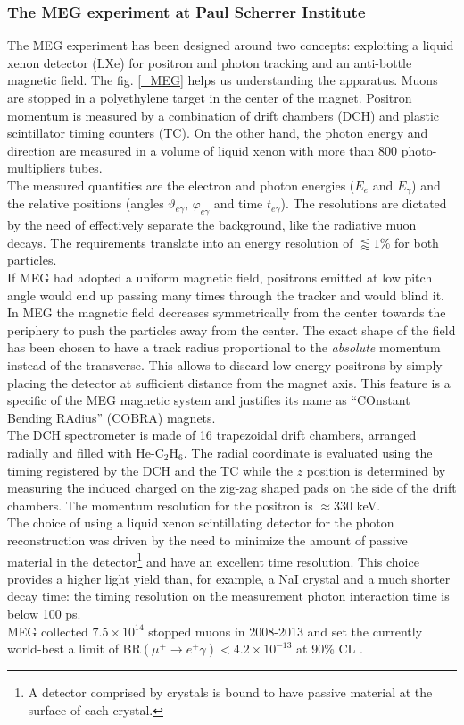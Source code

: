 \documentclass[12pt,a4paper,openright, oneside, titlepage]{book} %
\begin{document}
\subsubsection{The MEG experiment at Paul Scherrer Institute}
The MEG experiment \cite{MEG} has been designed around two concepts: exploiting a liquid xenon detector (LXe) for positron and photon tracking and an anti-bottle magnetic field. 
The fig. \ref{_MEG} helps us understanding the apparatus. Muons are stopped in a polyethylene target in the center of the magnet. Positron momentum is measured by a combination of drift chambers (DCH) and plastic scintillator timing counters (TC). 
On the other hand, the photon energy and direction are measured in a volume of liquid xenon with more than 800 photo-multipliers tubes.\\
The measured quantities are the electron and photon energies ($E_e$ and $E_\gamma$) and the relative positions (angles $\vartheta_{e\gamma}$, $\varphi_{e\gamma}$ and time $t_{e\gamma}$). 
The resolutions are dictated by the need of effectively separate the background, like the radiative muon decays. 
The requirements translate into an energy resolution of $\lessapprox 1\%$ for both particles.\\
If MEG had adopted a uniform magnetic field, positrons emitted at low pitch angle would end up passing many times through the tracker and would blind it. 
In MEG the magnetic field decreases symmetrically from the center towards the periphery to push the particles away from the center. 
The exact shape of the field has been chosen to have a track radius proportional to the \textit{absolute} momentum instead of the transverse. 
This allows to discard low energy positrons by simply placing the detector at sufficient distance from the magnet axis. 
This feature is a specific of the MEG magnetic system and justifies its name as ``COnstant Bending RAdius'' (COBRA) magnets.\\
The DCH spectrometer is made of 16 trapezoidal drift chambers, arranged radially and filled with He-C$_2$H$_6$. The radial coordinate is evaluated using the timing registered by the DCH and the TC while the $z$ position is determined by measuring the induced charged on the zig-zag shaped pads on the side of the drift chambers. The momentum resolution for the positron is $\approx330$ keV.\\
The choice of using a liquid xenon scintillating detector for the photon reconstruction was driven by the need to minimize the amount of passive material in the detector\footnote{A detector comprised by crystals is bound to have passive material at the surface of each crystal.} and have an excellent time resolution. 
This choice provides a higher light yield than, for example, a NaI crystal and a much shorter decay time: the timing resolution on the measurement photon interaction time is below 100 ps.\\
MEG collected $7.5\times10^{14}$ stopped muons in  2008-2013 and set the currently world-best a limit of BR$(\mu^+\rightarrow e^+\gamma)<4.2\times10^{-13}$ at 90\% CL \cite{MEG}.
\end{document}
